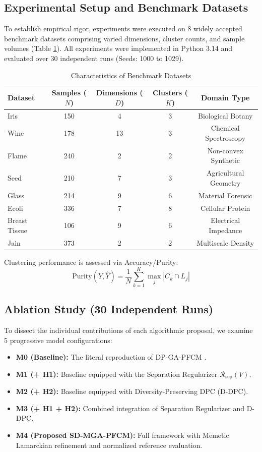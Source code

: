 \documentclass[preprint,12pt]{elsarticle}
\begin{document}
\subsection{Experimental Setup and Benchmark Datasets}
To establish empirical rigor, experiments were executed on 8 widely accepted benchmark datasets comprising varied dimensions, cluster counts, and sample volumes (Table \ref{tab:datasets}). All experiments were implemented in Python 3.14 and evaluated over 30 independent runs (Seeds: 1000 to 1029).

\begin{table}[htbp]
\centering
\caption{Characteristics of Benchmark Datasets}
\label{tab:datasets}
\begin{tabular}{lcccc}
\toprule
Dataset & Samples ($N$) & Dimensions ($D$) & Clusters ($K$) & Domain Type \\
\midrule
Iris           & 150 & 4  & 3 & Biological Botany \\
Wine           & 178 & 13 & 3 & Chemical Spectroscopy \\
Flame          & 240 & 2  & 2 & Non-convex Synthetic \\
Seed           & 210 & 7  & 3 & Agricultural Geometry \\
Glass          & 214 & 9  & 6 & Material Forensic \\
Ecoli          & 336 & 7  & 8 & Cellular Protein \\
Breast Tissue  & 106 & 9  & 6 & Electrical Impedance \\
Jain           & 373 & 2  & 2 & Multiscale Density \\
\bottomrule
\end{tabular}
\end{table}

Clustering performance is assessed via Accuracy/Purity:
\begin{equation}
\text{Purity}(Y, \hat{Y}) = \frac{1}{N} \sum_{k=1}^K \max_{j} |C_k \cap L_j|
\end{equation}

\subsection{Ablation Study (30 Independent Runs)}
To dissect the individual contributions of each algorithmic proposal, we examine 5 progressive model configurations:
\begin{itemize}
    \item \textbf{M0 (Baseline):} The literal reproduction of DP-GA-PFCM \cite{kuo2023density}.
    \item \textbf{M1 (+ H1):} Baseline equipped with the Separation Regularizer $\mathcal{R}_{\text{sep}}(V)$.
    \item \textbf{M2 (+ H2):} Baseline equipped with Diversity-Preserving DPC (D-DPC).
    \item \textbf{M3 (+ H1 + H2):} Combined integration of Separation Regularizer and D-DPC.
    \item \textbf{M4 (Proposed SD-MGA-PFCM):} Full framework with Memetic Lamarckian refinement and normalized reference evaluation.
\end{itemize}
\end{document}

